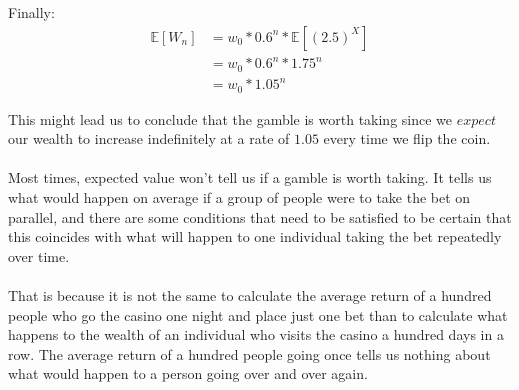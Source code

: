 \documentclass[12pt]{article}
\begin{document}
Finally:
\begin{equation*}
  \begin{split}
    \mathbb{E}[W_n] &= w_0 * 0.6^n * \mathbb{E}[(2.5)^X]\\
    &= w_0 * 0.6^n * 1.75^n\\
    &= w_0 * 1.05^n
  \end{split}
\end{equation*}

This might lead us to conclude that the gamble is worth taking since we $expect$ our wealth to increase indefinitely at a rate of $1.05$ every time we flip the coin.
\\\\
Most times, expected value won't tell us if a gamble is worth taking. It tells us what would happen on average if a group of people were to take the bet on parallel, and there are some conditions that need to be satisfied to be certain that this coincides with what will happen to one individual taking the bet repeatedly over time.
\\\\
That is because it is not the same to calculate the average return of a hundred people who go the casino one night and place just one bet than to calculate what happens to the wealth of an individual who visits the casino a hundred days in a row. The average return of a hundred people going once tells us nothing about what would happen to a person going over and over again. 
\end{document}
